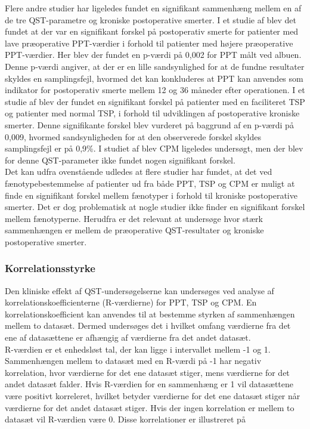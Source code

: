 Flere andre studier har ligeledes fundet en signifikant sammenhæng mellem en af de tre QST-parametre og kroniske postoperative smerter. \citep{Wylde2013} \citep{Wright2015} I et studie af  blev det fundet at der var en signifikant forskel på postoperativ smerte for patienter med lave præoperative PPT-værdier i forhold til patienter med højere præoperative PPT-værdier. Her blev der fundet en p-værdi på 0,002 for PPT målt ved albuen. Denne p-værdi angiver, at der er en lille sandsynlighed for at de fundne resultater skyldes en samplingsfejl, hvormed det kan konkluderes at PPT kan anvendes som indikator for postoperativ smerte mellem 12 og 36 måneder efter operationen. \citep{Wright2015} I et studie af  blev der fundet en signifikant forskel på patienter med en faciliteret TSP og patienter med normal TSP, i forhold til udviklingen af postoperative kroniske smerter. Denne signifikante forskel blev vurderet på baggrund af en p-værdi på 0,009, hvormed sandsynligheden for at den observerede forskel skyldes samplingsfejl er på 0,9\%. I studiet af  blev CPM ligeledes undersøgt, men der blev for denne QST-parameter ikke fundet nogen signifikant forskel. \\
Det kan udfra ovenstående udledes at flere studier har fundet, at det ved fænotypebestemmelse af patienter ud fra både PPT, TSP og CPM er muligt at finde en signifikant forskel mellem fænotyper i forhold til kroniske postoperative smerter. Det er dog problematisk at nogle studier ikke finder en signifikant forskel mellem fænotyperne. \citep{Leary2016} Herudfra er det relevant at undersøge hvor stærk sammenhængen er mellem de præoperative QST-resultater og kroniske postoperative smerter.

\subsubsection{Korrelationsstyrke}
Den kliniske effekt af QST-undersøgelserne kan undersøges ved analyse af korrelationskoefficienterne (R-værdierne) for PPT, TSP og CPM. En korrelationskoefficient kan anvendes til at bestemme styrken af sammenhængen mellem to datasæt. Dermed undersøges det i hvilket omfang værdierne fra det ene af datasættene er afhængig af værdierne fra det andet datasæt. \citep{Zar2010} \\
R-værdien er et enhedsløst tal, der kan ligge i intervallet mellem -1 og 1. Sammenhængen mellem to datasæt med en R-værdi på -1 har negativ korrelation, hvor værdierne for det ene datasæt stiger, mens værdierne for det andet datasæt falder. Hvis R-værdien for en sammenhæng er 1 vil datasættene være positivt korreleret, hvilket betyder værdierne for det ene datasæt stiger når værdierne for det andet datasæt stiger. Hvis der ingen korrelation er mellem to datasæt vil R-værdien være 0. \citep{Zar2010} Disse korrelationer er illustreret på 

